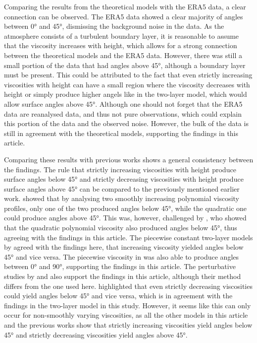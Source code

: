 Comparing the results from the theoretical models with the ERA5 data, a clear connection can be observed. The ERA5 data showed a clear majority of angles between \ang{0} and \ang{45}, dismissing the background noise in the data. As the atmosphere consists of a turbulent boundary layer, it is reasonable to assume that the viscosity increases with height, which allows for a strong connection between the theoretical models and the ERA5 data. However, there was still a small portion of the data that had angles above \ang{45}, although a boundary layer must be present. This could be attributed to the fact that even strictly increasing viscosities with height can have a small region where the viscosity decreases with height or simply produce higher angels like in the two-layer model, which would allow surface angles above \ang{45}. Although one should not forget that the ERA5 data are reanalysed data, and thus not pure observations, which could explain this portion of the data and the observed noise. However, the bulk of the data is still in agreement with the theoretical models, supporting the findings in this article.

Comparing these results with previous works shows a general consistency between the findings. The rule that strictly increasing viscosities with height produce surface angles below \ang{45} and strictly decreasing viscosities with height produce surface angles above \ang{45} can be compared to the previously mentioned earlier work. \citet{ionescu-kruse2021} showed that by analysing two smoothly increasing polynomial viscosity profiles, only one of the two produced angles below \ang{45}, while the quadratic one could produce angles above \ang{45}. This was, however, challenged by \citet{guan2023}, who showed that the quadratic polynomial viscosity also produced angles below \ang{45}, thus agreeing with the findings in this article. The piecewise constant two-layer models by \citet{dritschel2020} agreed with the findings here, that increasing viscosity yielded angles below \ang{45} and vice versa. The piecewise viscosity in \citet{guan2023} was also able to produce angles between \ang{0} and \ang{90}, supporting the findings in this article. The perturbative studies by \citet{bressan2019} and \citet{constantin2021} also support the findings in this article, although their method differs from the one used here. \citet{constantin2021} highlighted that even strictly decreasing viscosities could yield angles below \ang{45} and vice versa, which is in agreement with the findings in the two-layer model in this study. However, it seems like this can only occur for non-smoothly varying viscosities, as all the other models in this article and the previous works show that strictly increasing viscosities yield angles below \ang{45} and strictly decreasing viscosities yield angles above \ang{45}.

